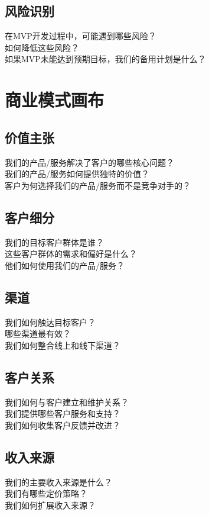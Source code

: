 \documentclass[12pt]{book}
\begin{document}
\subsection{风险识别}
在MVP开发过程中，可能遇到哪些风险？\\
如何降低这些风险？\\
如果MVP未能达到预期目标，我们的备用计划是什么？\\

\section{商业模式画布}
\subsection{价值主张}
我们的产品/服务解决了客户的哪些核心问题？\\
我们的产品/服务如何提供独特的价值？\\
客户为何选择我们的产品/服务而不是竞争对手的？\\

\subsection{客户细分}
我们的目标客户群体是谁？\\
这些客户群体的需求和偏好是什么？\\
他们如何使用我们的产品/服务？\\

\subsection{渠道}
我们如何触达目标客户？\\
哪些渠道最有效？\\
我们如何整合线上和线下渠道？\\

\subsection{客户关系}
我们如何与客户建立和维护关系？\\
我们提供哪些客户服务和支持？\\
我们如何收集客户反馈并改进？\\

\subsection{收入来源}
我们的主要收入来源是什么？\\
我们有哪些定价策略？\\
我们如何扩展收入来源？\\
\end{document}
